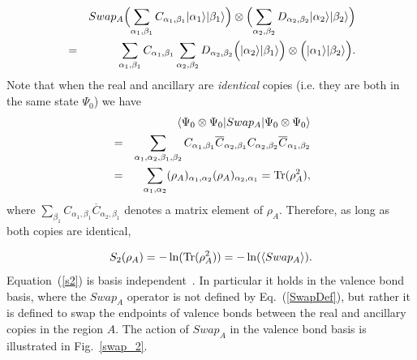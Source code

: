 \documentclass[prl,aps,twocolumn,floatfix,amsmath,amssymb,superscriptaddress,tightenlines]{revtex4}
\begin{document}
\begin{eqnarray}
\label{SwapDef}
&& Swap_A  \Bigl( \sum_{\alpha_1,\beta_1} C_{\alpha_1,\beta_1}|\alpha_1\rangle |\beta_1\rangle \Bigr) \otimes
\Bigl( \sum_{\alpha_2,\beta_2} D_{\alpha_2,\beta_2}|\alpha_2\rangle
|\beta_2\rangle \Bigr) \nonumber\\ &=&
\sum_{\alpha_1,\beta_1} C_{\alpha_1,\beta_1}
\sum_{\alpha_2,\beta_2} D_{\alpha_2,\beta_2}
\Bigl( |\alpha_2\rangle |\beta_1\rangle \Bigr) \otimes
\Bigl( |\alpha_1\rangle |\beta_2\rangle \Bigr).
\end{eqnarray}
Note that when the real and ancillary are \textit{identical} copies (i.e.
they are both in the same state $\Psi_0$) we have
\begin{eqnarray}
\label{H2fromSwap}
&& \langle \Psi_0\otimes \Psi_0|Swap_A|\Psi_0\otimes \Psi_0\rangle
\nonumber \\ 
&=& 
\sum_{\alpha_1,\alpha_2,\beta_1,\beta_2} C_{\alpha_1,\beta_1} \overline C_{\alpha_2,\beta_1} C_{\alpha_2,\beta_2} \overline C_{\alpha_1,\beta_2}
\nonumber \\
&=&
\sum_{\alpha_1,\alpha_2} (\rho_A)_{\alpha_1,\alpha_2}
(\rho_A)_{\alpha_2,\alpha_1}={\rm Tr}(\rho_A^2),
\end{eqnarray}
where $\sum_{\beta_1}C_{\alpha_1,\beta_1} \overline C_{\alpha_2,\beta_1}$
denotes a matrix element of $\rho_A$. Therefore, as long as both copies
are identical, 

\begin{equation} 
\label{s2}
S_2(\rho_A) =-\ln({\rm Tr}(\rho_A^2))=-\ln(\langle Swap_A \rangle). 
\end{equation}
Equation~(\ref{s2}) is basis independent~\cite{Jaeger}. In particular it
holds in the valence bond basis, where the $Swap_A$ operator is not
defined by Eq.~(\ref{SwapDef}), but rather it is defined to swap the
endpoints of valence bonds between the real and ancillary copies in the
region $A$.  The action of $Swap_A$ in the valence bond basis is
illustrated in Fig.~\ref{swap_2}.  
\end{document}
